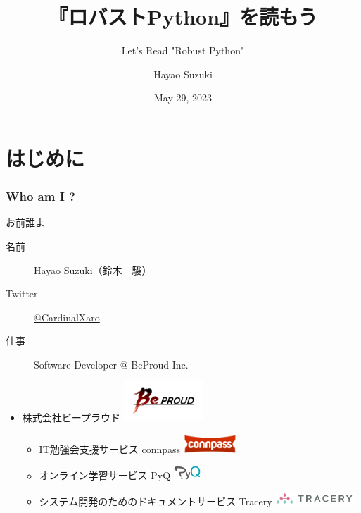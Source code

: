 \documentclass[aspectratio=169,dvipdfmx,14pt,notheorems]{beamer}
\title{『ロバストPython』を読もう}
\subtitle{Let\rq{}s Read "Robust Python"}
\author[Hayao]{Hayao Suzuki}
\institute[BPStudy\#189]{BPStudy\#189}
\date{May 29, 2023}
\theoremstyle{definition}
\begin{document}
\begin{frame}[plain]\frametitle{}
\titlepage %
\end{frame}

\section{はじめに}

\begin{frame}\frametitle{Who am I ?}

\begin{block}{お前誰よ}
\begin{description}
\item[名前] Hayao Suzuki（鈴木　駿）
\item[Twitter] \href{https://twitter.com/CardinalXaro}{@CardinalXaro}
\item[仕事] Software Developer @ BeProud Inc.
\end{description}
\end{block}

\begin{center}
\begin{itemize}
\item 株式会社ビープラウド \includegraphics[width=3cm]{bplogo.png}
\begin{itemize}
\item IT勉強会支援サービス connpass \includegraphics[width=2cm]{connpass_logo_1.png}
\item オンライン学習サービス PyQ \includegraphics[width=1cm]{pyq_logo_color.png}
\item システム開発のためのドキュメントサービス Tracery \includegraphics[width=3cm]{tracery.png}
\end{itemize}
\end{itemize}
\end{center}

\end{frame}
\end{document}
